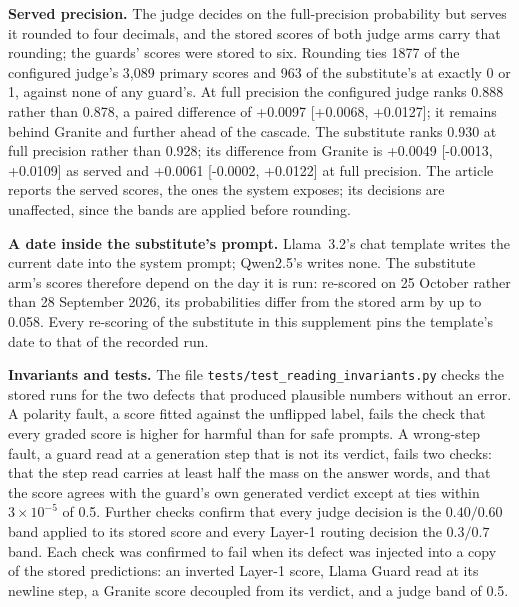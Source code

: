 \textbf{Served precision.} The judge decides on the full-precision probability but serves it rounded to four decimals, and the stored scores of both judge arms carry that rounding; the guards' scores were stored to six. Rounding ties 1877 of the configured judge's 3{,}089 primary scores and 963 of the substitute's at exactly 0 or 1, against none of any guard's. At full precision the configured judge ranks 0.888 rather than 0.878, a paired difference of +0.0097 [+0.0068, +0.0127]; it remains behind Granite and further ahead of the cascade. The substitute ranks 0.930 at full precision rather than 0.928; its difference from Granite is +0.0049 [-0.0013, +0.0109] as served and +0.0061 [-0.0002, +0.0122] at full precision. The article reports the served scores, the ones the system exposes; its decisions are unaffected, since the bands are applied before rounding.

\textbf{A date inside the substitute's prompt.} Llama~3.2's chat template writes the current date into the system prompt; Qwen2.5's writes none. The substitute arm's scores therefore depend on the day it is run: re-scored on 25 October rather than 28 September 2026, its probabilities differ from the stored arm by up to 0.058. Every re-scoring of the substitute in this supplement pins the template's date to that of the recorded run.

\textbf{Invariants and tests.} The file \texttt{tests/\allowbreak test\_reading\_\allowbreak invariants.py} checks the stored runs for the two defects that produced plausible numbers without an error. A polarity fault, a score fitted against the unflipped label, fails the check that every graded score is higher for harmful than for safe prompts. A wrong-step fault, a guard read at a generation step that is not its verdict, fails two checks: that the step read carries at least half the mass on the answer words, and that the score agrees with the guard's own generated verdict except at ties within $3\times10^{-5}$ of 0.5. Further checks confirm that every judge decision is the $0.40/0.60$ band applied to its stored score and every Layer-1 routing decision the $0.3/0.7$ band. Each check was confirmed to fail when its defect was injected into a copy of the stored predictions: an inverted Layer-1 score, Llama Guard read at its newline step, a Granite score decoupled from its verdict, and a judge band of 0.5.

